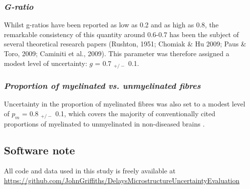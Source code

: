 \subsubsection*{\textit{G-ratio}}

Whilst g-ratios have been reported as low as 0.2 and as high as 0.8, the
remarkable consistency of this quantity around 0.6-0.7 has been the
subject of several theoretical research papers (Rushton, 1951; Chomiak
\& Hu 2009; Paus \& Toro, 2009; Caminiti et al., 2009). This parameter
was therefore assigned a modest level of uncertainty: $g$ = 0.7 $_{+/-}$
0.1. 

\subsubsection*{\textit{Proportion of myelinated vs. unmyelinated fibres}}

Uncertainty in the proportion of myelinated fibres was
also set to a modest level of $p_{m}$ = 0.8 $_{+/-}$ 0.1, which covers
the majority of conventionally cited proportions of myelinated to
unmyelinated in non-diseased brains  .

 
\subsection{Software note}

All code and data used in this study is freely available at \url{https://github.com/JohnGriffiths/DelaysMicrostructureUncertaintyEvaluation}






